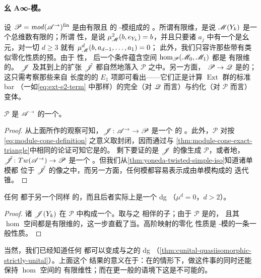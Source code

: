 \paragraph{幺 A∞-模。}\label{sub:unital-modules}
设 $\mathscr{P}=\mathit{mod}(\mathscr{A}^{\rightarrow})^{\mathrm{fin}}$ 是由有限且%
\trStrictlyUnital{}的 \trAinfty-模组成的 \trACategory。所谓有限维，是说
$\mathscr{M}(Y_k)$ 是一个总维数有限的\trGraded\trVectorSpace{}；所谓%
\trStrictlyUnital{}性，是说 $\mu^2_{\mathscr{M}}(b,e_{Y_k})=b$，并且只要诸 $a_j$
中有一个是幺元，对一切 $d\ge 3$ 就有 $\mu^d_{\mathscr{M}}(b,a_{d-1},\ldots,a_1)=0$；
此外，我们只容许那些带有类似零化性质的预\trModule\trHomomorphism。由于%
\trDirected{}性，
后一个条件蕴含\trMorphism{}空间 $\hom_{\mathscr{P}}(\mathscr{M}_0,\mathscr{M}_1)$ 都是
有限维的。\trYonedaEmbedding{} $\mathscr{J}$ 及其到\trTwistedComplex{}上的扩张
$\tilde{\mathscr{J}}$ 都自然地落入 $\mathscr{P}$ 之中。另一方面，\trEmbedding
$\mathscr{P}\to\mathscr{Q}$ 是\trCohomology\trFullyFaithful{}的；这只需考察那些来自
长度\trFiltration{}的\trSpectralSequence{}的 $E_1$ 项即可看出——它们正是计算%
\trModule{} $\operatorname{Ext}$ 群的标准 bar \trComplex（一如\eqref{eq:ext-e2-term}
中那样）的完全（对 $\mathscr{Q}$ 而言）与约化（对 $\mathscr{P}$ 而言）变体。

\begin{corollary}\label{thm:unital-mod-triangulated-envelope}
$\mathscr{P}$ 是 $\mathscr{A}^{\rightarrow}$ 的一个\trTriangulated\trEnvelope。
\end{corollary}

\begin{proof}
从上面所作的观察可知，$\mathscr{J}\colon\mathscr{A}^{\rightarrow}\to\mathscr{P}$ 是一个%
\trCohomology\trFullyFaithful{}的 \trAFunctor。此外，$\mathscr{P}$ 对按
\eqref{eq:module-cone-definition} 之意义取\trMappingCone{}封闭，因而通过与%
\cref{thm:module-cone-exact-triangle}中相同的论证可知它是\trTriangulated{}的。
剩下要证的是 $\mathscr{J}$ 的像生成 $\mathscr{P}$，或者\trEquivalence{}地，
$\tilde{\mathscr{J}}\colon Tw(\mathscr{A}^{\rightarrow})\to\mathscr{P}$ 是一个%
\trQuasiequivalence。但我们从\cref{thm:yoneda-twisted-simple-iso}知道诸单模都
位于 $\tilde{\mathscr{J}}$ 的像之中，而另一方面，任何模都容易表示成由单模构成的
迭代锥。
\end{proof}

\begin{corollary}\label{thm:directed-quasiisomorphic-dg}
任何\trDirected{} \trACategory{}都\trQuasiisomorphic{}于另一个同样\trDirected{}%
的\trCategory，而且后者实际上是一个 dg \trCategory{}（$\mu^d=0$，$d>2$）。
\end{corollary}

\begin{proof}
诸 $\mathscr{J}(Y_k)$ 在 $\mathscr{P}$ 中构成一个\trExceptionalCollection。取与之
相伴的\trDirected{}子\trCategory；由于 $\mathscr{P}$ 是\trStrictlyUnital{}的，
且其 $\hom$ 空间都是有限维的，这一步直截了当。高阶\trComposition{}映射的零化
性质是 \trAinfty-模的一条一般性质。
\end{proof}

当然，我们已经知道任何 \trACategory{}都可以变成与之\trQuasiisomorphic{}的
dg \trCategory{}（\cref{thm:cunital-quasiisomorphic-strictly-unital}）。上面这个
结果的意义在于：在\trDirected{}的情形下，做这件事的同时还能保持 $\hom$ 空间的
有限维性；而在更一般的语境下这是不可能的。
